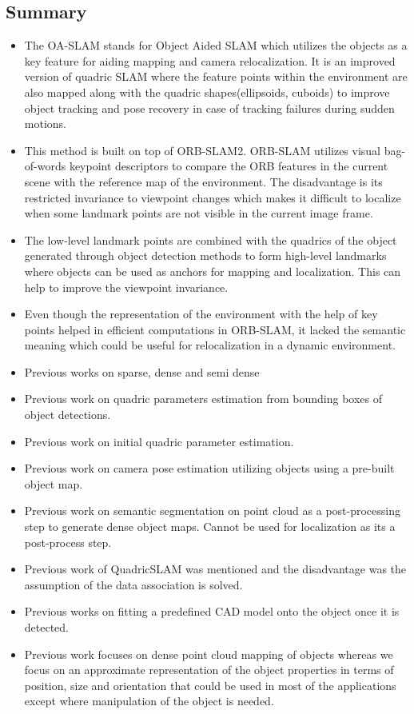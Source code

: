 \documentclass[report.tex]{subfiles}
\begin{document}
    \subsection{Summary}
    \begin{itemize}
\item The OA-SLAM\cite{oaslam} stands for Object Aided SLAM which utilizes the objects as a key feature for aiding mapping and camera relocalization. It is an improved version of quadric SLAM where the feature points within the environment are also mapped along with the quadric shapes(ellipsoids, cuboids) to improve object tracking and pose recovery in case of tracking failures during sudden motions.
\item This method is built on top of ORB-SLAM2. ORB-SLAM utilizes visual bag-of-words keypoint descriptors to compare the ORB features in the current scene with the reference map of the environment. The disadvantage is its restricted invariance to viewpoint changes which makes it difficult to localize when some landmark points are not visible in the current image frame.
\item The low-level landmark points are combined with the quadrics of the object generated through object detection methods to form high-level landmarks where objects can be used as anchors for mapping and localization. This can help to improve the viewpoint invariance.
\item Even though the representation of the environment with the help of key points helped in efficient computations in ORB-SLAM, it lacked the semantic meaning which could be useful for relocalization in a dynamic environment. 
\end{itemize}

\begin{itemize}
    \item Previous works on sparse, dense and semi dense
    \item Previous work on quadric parameters estimation from bounding boxes of object detections.
    \item Previous work on initial quadric parameter estimation.
    \item Previous work on camera pose estimation utilizing objects using a pre-built object map.
    \item Previous work on semantic segmentation on point cloud as a post-processing step to generate dense object maps. Cannot be used for localization as its a post-process step.
    \item Previous work of QuadricSLAM\cite{quadric2} was mentioned and the disadvantage was the assumption of the data association is solved.
    \item Previous works on fitting a predefined CAD model onto the object once it is detected.
    \item Previous work focuses on dense point cloud mapping of objects whereas we focus on an approximate representation of the object properties in terms of position, size and orientation that could be used in most of the applications except where manipulation of the object is needed.
    
\end{itemize}
\end{document}
